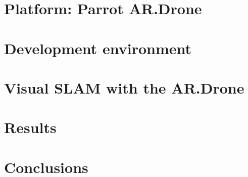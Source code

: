 \documentclass[twoside]{uva-bachelor-thesis}
\begin{document}
\chapter{Platform: Parrot AR.Drone}
\label{chapter:platform}




\chapter{Development environment}
\label{chapter:development-environment}




\chapter{Visual SLAM with the AR.Drone}
\label{chapter:visual-slam}




\chapter{Results}
\label{chapter:results}




%



\chapter{Conclusions}
\label{chapter:conclusions}




\appendix


\linespread{1.0}

%

\end{document}
